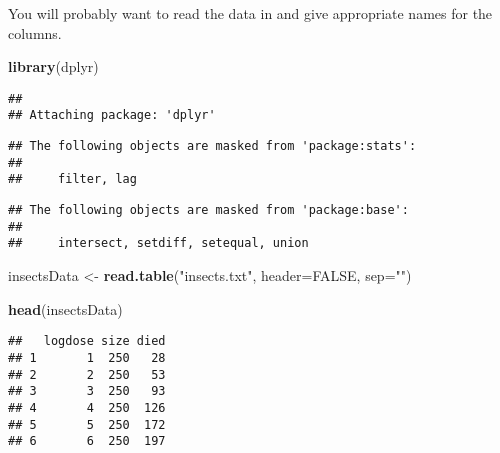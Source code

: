 \documentclass[
]{article}
\newenvironment{Shaded}{\begin{snugshade}}{\end{snugshade}}
\newcommand{\CommentTok}[1]{\textcolor[rgb]{0.56,0.35,0.01}{\textit{#1}}}
\newcommand{\DataTypeTok}[1]{\textcolor[rgb]{0.13,0.29,0.53}{#1}}
\newcommand{\KeywordTok}[1]{\textcolor[rgb]{0.13,0.29,0.53}{\textbf{#1}}}
\newcommand{\NormalTok}[1]{#1}
\newcommand{\OperatorTok}[1]{\textcolor[rgb]{0.81,0.36,0.00}{\textbf{#1}}}
\newcommand{\OtherTok}[1]{\textcolor[rgb]{0.56,0.35,0.01}{#1}}
\newcommand{\StringTok}[1]{\textcolor[rgb]{0.31,0.60,0.02}{#1}}
\begin{document}
You will probably want to read the data in and give appropriate names
for the columns.

\begin{Shaded}
\begin{Highlighting}[]
\KeywordTok{library}\NormalTok{(dplyr)}
\end{Highlighting}
\end{Shaded}

\begin{verbatim}
## 
## Attaching package: 'dplyr'
\end{verbatim}

\begin{verbatim}
## The following objects are masked from 'package:stats':
## 
##     filter, lag
\end{verbatim}

\begin{verbatim}
## The following objects are masked from 'package:base':
## 
##     intersect, setdiff, setequal, union
\end{verbatim}

\begin{Shaded}
\begin{Highlighting}[]
\NormalTok{insectsData <-}\StringTok{ }\KeywordTok{read.table}\NormalTok{(}\StringTok{"insects.txt"}\NormalTok{, }\DataTypeTok{header=}\OtherTok{FALSE}\NormalTok{, }\DataTypeTok{sep=}\StringTok{""}\NormalTok{)}
\end{Highlighting}
\end{Shaded}

\begin{Shaded}
\end{Shaded}

\begin{Shaded}
\begin{Highlighting}[]
\KeywordTok{head}\NormalTok{(insectsData)}
\end{Highlighting}
\end{Shaded}

\begin{verbatim}
##   logdose size died
## 1       1  250   28
## 2       2  250   53
## 3       3  250   93
## 4       4  250  126
## 5       5  250  172
## 6       6  250  197
\end{verbatim}
\end{document}
